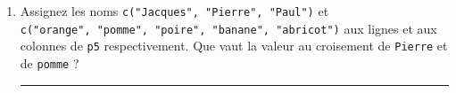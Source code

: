 \documentclass[12pt,twosided, notitlepage]{book}
\newenvironment{Shaded}{}{}
\newcommand{\KeywordTok}[1]{\textcolor[rgb]{0.00,0.00,1.00}{{#1}}}
\newcommand{\DataTypeTok}[1]{{#1}}
\newcommand{\DecValTok}[1]{{#1}}
\newcommand{\StringTok}[1]{\textcolor[rgb]{0.00,0.50,0.50}{{#1}}}
\newcommand{\CommentTok}[1]{\textcolor[rgb]{0.00,0.50,0.00}{{#1}}}
\newcommand{\NormalTok}[1]{{#1}}
\newif \ifsol
\renewenvironment{Shaded}{\begin{snugshade}}{\end{snugshade}}
\begin{document}
\begin{enumerate}
  \ifsol 

  \begin{center} \rule{0.5\linewidth}{\linethickness}\end{center}

\begin{Shaded}
\begin{Highlighting}[]
\CommentTok{# Création de p5}
\NormalTok{p5 <-}\StringTok{ }\KeywordTok{matrix}\NormalTok{(}\DecValTok{15}\NormalTok{:}\DecValTok{1}\NormalTok{, }\DataTypeTok{nrow =} \DecValTok{3}\NormalTok{)}
\NormalTok{p5}
  \NormalTok{##      [,1] [,2] [,3] [,4] [,5]}
  \NormalTok{## [1,]   15   12    9    6    3}
  \NormalTok{## [2,]   14   11    8    5    2}
  \NormalTok{## [3,]   13   10    7    4    1}

\CommentTok{# Sélection des éléments demandés}
\NormalTok{p5[}\DecValTok{1}\NormalTok{, }\DecValTok{4}\NormalTok{]}
  \NormalTok{## [1] 6}
\NormalTok{p5[}\DecValTok{3}\NormalTok{, ]}
  \NormalTok{## [1] 13 10  7  4  1}
\NormalTok{p5[, }\DecValTok{2}\NormalTok{]}
  \NormalTok{## [1] 12 11 10}

\NormalTok{p5[}\KeywordTok{c}\NormalTok{(}\DecValTok{1}\NormalTok{, }\DecValTok{2}\NormalTok{), }\KeywordTok{c}\NormalTok{(}\DecValTok{3}\NormalTok{, }\DecValTok{4}\NormalTok{)]}
  \NormalTok{##      [,1] [,2]}
  \NormalTok{## [1,]    9    6}
  \NormalTok{## [2,]    8    5}
\CommentTok{# Taper p5[c(1, 2), c(3, 4)] permet de sélectionner}
\CommentTok{# une sous-matrice définie par les lignes 1 et 2}
\CommentTok{# d'une part et les colonnes 3 et 4 d'autre part.}
\end{Highlighting}
\end{Shaded}

  \begin{center} \rule{0.5\linewidth}{\linethickness}\end{center}

  \bigskip  \fi 
\item
  Assignez les noms \texttt{c("Jacques",\ "Pierre",\ "Paul")} et
  \texttt{c("orange",\ "pomme",\ "poire",\ "banane",\ "abricot")} aux
  lignes et aux colonnes de \texttt{p5}
  respectivement\index{\texttt{[}}. Que vaut la valeur au croisement de
  \texttt{Pierre} et de \texttt{pomme} ?

  \ifsol 

  \begin{center} \rule{0.5\linewidth}{\linethickness}\end{center}


\end{enumerate}
\end{document}
